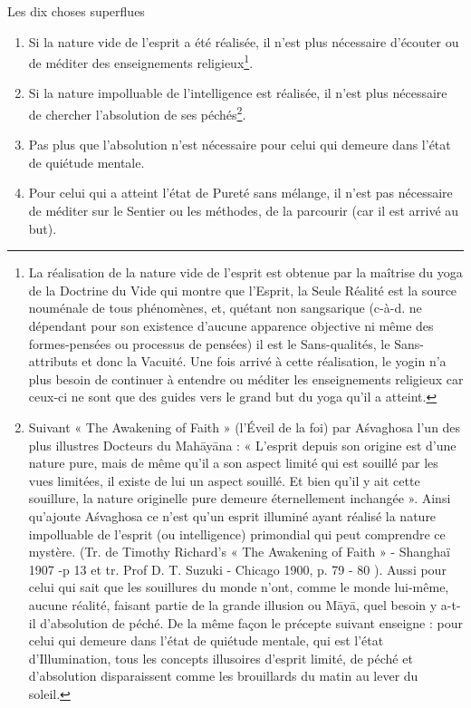 \documentclass[10pt]{book}
\makeatletter
\renewcommand{\section}{\@startsection{section}{0}{0mm}
   {\baselineskip}
   {\baselineskip}{\normalfont\normalsize\scshape\centering}
}
\makeatother
\begin{document}
\section{Les dix choses superflues}
\begin{enumerate}[1.-]
\item Si la nature vide de l'esprit a été réalisée, il n'est plus nécessaire d'écouter ou de méditer des enseignements religieux\footnote{La réalisation de la nature vide de l'esprit est obtenue par la maîtrise du yoga de la Doctrine du Vide qui montre que l'Esprit, la Seule Réalité est la source nouménale de tous phénomènes, et, quétant non sangsarique (c-à-d. ne dépendant pour son existence d'aucune apparence objective ni même des formes-pensées ou processus de pensées) il est le Sans-qualités, le Sans-attributs et donc la Vacuité. Une fois arrivé à cette réalisation, le yogin n'a plus besoin de continuer à entendre ou méditer les enseignements religieux car ceux-ci ne sont que des guides vers le grand but du yoga qu'il a atteint.}.
\item Si la nature impolluable de l'intelligence est réalisée, il n'est plus nécessaire de chercher l'absolution de ses péchés\footnote{Suivant « The Awakening of Faith » (l'Éveil de la foi) par Aśvaghosa l'un des plus illustres Docteurs du Mahāyāna : « L'esprit depuis son origine est d'une nature pure, mais de même qu'il a son aspect limité qui est souillé par les vues limitées, il existe de lui un aspect souillé. Et bien qu'il y ait cette souillure, la nature originelle pure demeure éternellement inchangée ». Ainsi qu'ajoute Aśvaghosa ce n'est qu'un esprit illuminé ayant réalisé la nature impolluable de l'esprit (ou intelligence) primondial qui peut comprendre ce mystère. (Tr. de Timothy Richard's « The Awakening of Faith » - Shanghaï 1907 -p 13 et tr. Prof D. T. Suzuki - Chicago 1900, p. 79 - 80 ). Aussi pour celui qui sait que les souillures du monde n'ont, comme le monde lui-même, aucune réalité, faisant partie de la grande illusion ou Māyā, quel besoin y a-t-il d'absolution de péché. De la même façon le précepte suivant enseigne : pour celui qui demeure dans l'état de quiétude mentale, qui est l'état d'Illumination, tous les concepts illusoires d'esprit limité, de péché et d'absolution disparaissent comme les brouillards du matin au lever du soleil.}.
\item Pas plus que l'absolution n'est nécessaire pour celui qui demeure dans l'état de quiétude mentale.
\item Pour celui qui a atteint l'état de Pureté sans mélange, il n'est pas nécessaire de méditer sur le Sentier ou les méthodes, de la parcourir (car il est arrivé au but).

\end{enumerate}
\end{document}
